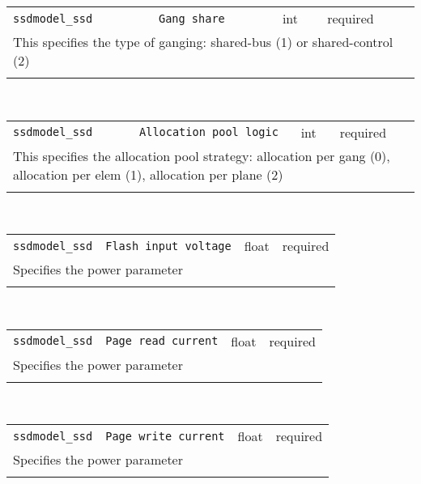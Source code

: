 \noindent 
\begin{tabular}{|p{\lpmodwidth}|p{\lpnamewidth}|p{0.5in}|p{0.5in}|}
\cline{1-4}
\texttt{ssdmodel\_ssd} & \texttt{Gang share} & int & required \\ 
\cline{1-4}
\multicolumn{4}{|p{6in}|}{
This specifies the type of ganging: shared-bus (1) or shared-control (2)
}\\ 
\cline{1-4}
\multicolumn{4}{p{5in}}{}\\
\end{tabular}\\ 
\noindent 
\begin{tabular}{|p{\lpmodwidth}|p{\lpnamewidth}|p{0.5in}|p{0.5in}|}
\cline{1-4}
\texttt{ssdmodel\_ssd} & \texttt{Allocation pool logic} & int & required \\ 
\cline{1-4}
\multicolumn{4}{|p{6in}|}{
This specifies the allocation pool strategy: allocation per gang (0),
allocation per elem (1), allocation per plane (2)
}\\ 
\cline{1-4}
\multicolumn{4}{p{5in}}{}\\
\end{tabular}\\ 
\noindent 
\begin{tabular}{|p{\lpmodwidth}|p{\lpnamewidth}|p{0.5in}|p{0.5in}|}
\cline{1-4}
\texttt{ssdmodel\_ssd} & \texttt{Flash input voltage} & float & required \\ 
\cline{1-4}
\multicolumn{4}{|p{6in}|}{
Specifies the power parameter
}\\ 
\cline{1-4}
\multicolumn{4}{p{5in}}{}\\
\end{tabular}\\ 
\noindent 
\begin{tabular}{|p{\lpmodwidth}|p{\lpnamewidth}|p{0.5in}|p{0.5in}|}
\cline{1-4}
\texttt{ssdmodel\_ssd} & \texttt{Page read current} & float & required \\ 
\cline{1-4}
\multicolumn{4}{|p{6in}|}{
Specifies the power parameter
}\\ 
\cline{1-4}
\multicolumn{4}{p{5in}}{}\\
\end{tabular}\\ 
\noindent 
\begin{tabular}{|p{\lpmodwidth}|p{\lpnamewidth}|p{0.5in}|p{0.5in}|}
\cline{1-4}
\texttt{ssdmodel\_ssd} & \texttt{Page write current} & float & required \\ 
\cline{1-4}
\multicolumn{4}{|p{6in}|}{
Specifies the power parameter
}\\ 
\cline{1-4}
\multicolumn{4}{p{5in}}{}\\
\end{tabular}\\ 
